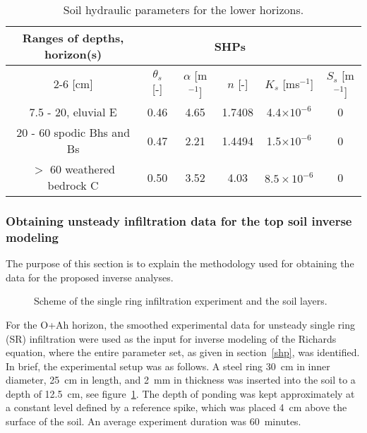 \documentclass[review]{elsarticle}
\begin{document}
\begin{table}[ht]
\begin{center}
\caption{Soil hydraulic parameters for the lower horizons.}
\begin{small}
\doublespacing
\begin{tabular}{c c c c c c}
\toprule
Ranges of depths, horizon(s)&\multicolumn{4}{c}{SHPs}\\ \cline{2-6}
[cm]&$\theta_s$ [-] & $\alpha$ [m$^{-1}$]& $n$ [-]& $K_s$ [ms$^{-1}$] & $S_s$ [m$^{-1}$] \\ \hline
7.5 - 20, eluvial E&0.46&4.65&1.7408&4.4$\times 10^{-6}$ & 0\\
20 - 60 spodic Bhs and Bs&0.47&2.21&1.4494&1.5$\times 10^{-6}$ & 0\\
$>$ 60 weathered bedrock C & 0.50 & 3.52 & 4.03 &  $8.5\times 10^{-6}$ & 0 \\
\toprule
\end{tabular}
\end{small}
\label{tab_SHP}
\end{center}
\end{table}


\subsubsection{Obtaining unsteady infiltration data for the top soil inverse modeling}
\label{krivka}

The purpose of this section is to explain the methodology used for obtaining the data for the proposed inverse analyses. 


 \begin{figure}
\centering
{}
 \caption{Scheme of the single ring infiltration experiment and the soil layers. }
 \label{experiment}
\end{figure}


For the O+Ah horizon, the smoothed experimental data for unsteady single ring (SR) infiltration were used as the input for inverse modeling of the Richards equation, where the entire parameter set, as given in section~\ref{shp}, was identified. 
In brief, the experimental setup was as follows. A steel ring 30~cm in inner diameter, 25~cm in length, and 2~mm in thickness was inserted into the soil to a depth of 12.5~cm, see figure~\ref{experiment}. The depth of ponding was kept approximately at a constant level defined by a reference spike, which was placed 4~cm above the surface of the soil.  An average experiment duration was 60~minutes.
\end{document}

